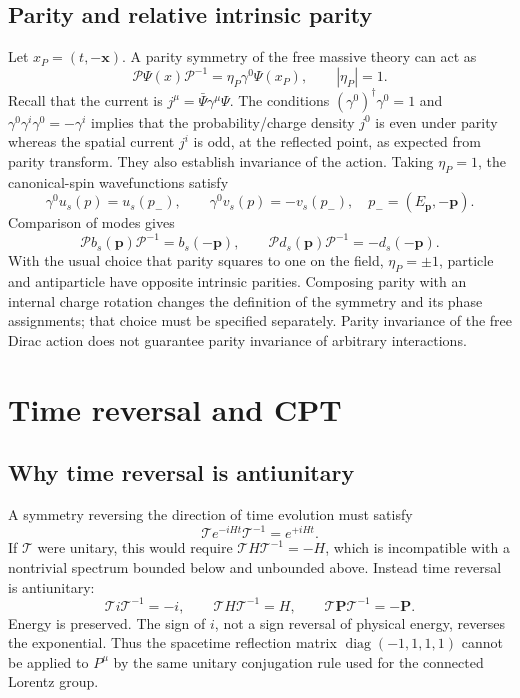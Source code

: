 \documentclass[11pt]{article}
\newcommand{\diag}{\operatorname{diag}}
\newcommand{\Dp}{\mathcal P}
\newcommand{\Dt}{\mathcal T}
\begin{document}
\subsection{Parity and relative intrinsic parity}
Let \(x_P=(t,-\bm x)\). A parity symmetry of the free massive theory can act as
\begin{equation}
 \Dp\Psi(x)\Dp^{-1}=\eta_P\gamma^0\Psi(x_P),\qquad |\eta_P|=1.
 \label{f-eq:Pfield}
\end{equation}
Recall that the current is $j^\mu=\bar{\Psi}\gamma^\mu\Psi$.
The conditions \((\gamma^0)^\dagger\gamma^0=1\) and
\(\gamma^0\gamma^i\gamma^0=-\gamma^i\) implies that the probability/charge density \(j^0\) is even under parity whereas the spatial current \(j^i\) is odd,
at the reflected point, as expected from parity transform. They also establish invariance of the action.
Taking \(\eta_P=1\), the canonical-spin wavefunctions satisfy
\[
 \gamma^0u_s(p)=u_s(p_-),\qquad \gamma^0v_s(p)=-v_s(p_-),
 \quad p_-=(E_{\bm p},-\bm p).
\]
Comparison of modes gives
\begin{equation}
 \Dp b_s(\bm p)\Dp^{-1}=b_s(-\bm p),\qquad
 \Dp d_s(\bm p)\Dp^{-1}=-d_s(-\bm p).
 \label{f-eq:Pmodes}
\end{equation}
With the usual choice that parity squares to one on the field,
\(\eta_P=\pm1\), particle and antiparticle have opposite intrinsic
parities. Composing parity with an internal charge rotation changes
the definition of the symmetry and its phase assignments; that choice
must be specified separately. Parity invariance of the free Dirac action
does not guarantee parity invariance of arbitrary interactions.

\section{Time reversal and CPT}
\subsection{Why time reversal is antiunitary}
A symmetry reversing the direction of time evolution must satisfy
\begin{equation}
 \Dt e^{-iHt}\Dt^{-1}=e^{+iHt}.
 \label{f-eq:Tevolution}
\end{equation}
If \(\Dt\) were unitary, this would require \(\Dt H\Dt^{-1}=-H\), which
is incompatible with a nontrivial spectrum bounded below and unbounded
above. Instead time reversal is antiunitary:
\begin{equation}
 \Dt i\Dt^{-1}=-i,\qquad \Dt H\Dt^{-1}=H,\qquad
 \Dt\bm P\Dt^{-1}=-\bm P.
 \label{f-eq:Tcharges}
\end{equation}
Energy is preserved. The sign of \(i\), not a sign reversal of physical
energy, reverses the exponential. Thus the spacetime reflection matrix
\(\diag(-1,1,1,1)\) cannot be applied to \(P^\mu\) by the same unitary
conjugation rule used for the connected Lorentz group.
\end{document}
